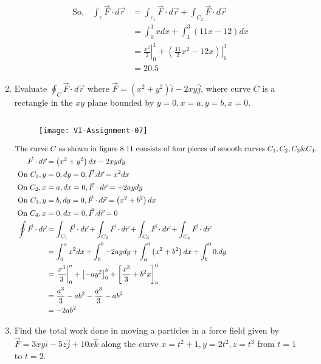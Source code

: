 \begin{enumerate}
\begin{answer}
\begin{align*}
	\text{So,}\quad
	\int_{c} \vec{F} \cdot d \vec{r}&=\int_{c_{1}} \vec{F} \cdot d \vec{r}+\int_{C_{2}} \vec{F} \cdot d \vec{r}\\
	&=\int_{0}^{1} x d x+\int_{1}^{3}(11 x-12) d x\\
	&=\left.\frac{x^{2}}{2}\right|_{0} ^{1}+\left.\left(\frac{11}{2} x^{2}-12 x\right)\right|_{1} ^{3}\\
	&=20.5
		\end{align*}
	\end{answer}
	\item Evaluate $\oint_{C} \vec{F} \cdot d \vec{r}$ where $\vec{F}=\left(x^{2}+y^{2}\right) \hat{i}-2 x y \hat{j}$, where curve $C$ is a rectangle in the $x y$ plane bounded by $y=0, x=a, y=b, x=0$.
	\begin{answer}$\left. \right. $
			\begin{figure}[H]
			\centering
			\texttt{[image: VI-Assignment-07]}
		\end{figure}
		\begin{align*}
		\intertext{The curve $C$ as shown in figure $8.11$ consists of four pieces of smooth curves $C_{1}, C_{2}, C_{3} \& C_{4}$. }
		\vec{F} \cdot d \vec{r}&=\left(x^{2}+y^{2}\right) d x-2 x y d y\\
		\text{On }C_{1}, y&=0, d y=0, \vec{F} . d \vec{r}=x^{2} d x\\
	\text{	On }C_{2}, x&=a, d x=0, \vec{F} \cdot d \vec{r}=-2 a y d y\\
		\text{On }C_{3}, y&=b, d y=0, \vec{F} \cdot d \vec{r}=\left(x^{2}+b^{2}\right) d x\\
		\text{On }C_{4}, x&=0, d x=0, \vec{F} . d \vec{r}=0\\
		\oint \vec{F} \cdot d \vec{r}&=\int_{C_{1}} \vec{F} \cdot d \vec{r}+\int_{C_{2}} \vec{F} \cdot d \vec{r}+\int_{C_{3}} \vec{F} \cdot d \vec{r}+\int_{C_{4}} \vec{F} \cdot d \vec{r}\\
		&=\int_{0}^{a} x^{2} d x+\int_{0}^{b}-2 a y d y+\int_{a}^{0}\left(x^{2}+b^{2}\right) d x+\int_{b}^{0} 0 . d y\\
		&=\left.\frac{x^{3}}{3}\right|_{0} ^{a}+\left[-a y^{2}\right]_{0}^{b}+\left[\frac{x^{3}}{3}+b^{2} x\right]_{a}^{0}\\
		&=\frac{a^{3}}{3}-a b^{2}-\frac{a^{3}}{3}-a b^{2}\\
		&=-2 a b^{2}
		\end{align*}
	\end{answer}
	\item Find the total work done in moving a particles in a force field given by $\vec{F}=3 x y \hat{i}-5 z \hat{j}+10 x \hat{k}$ along the curve $x=t^{2}+1, y=2 t^{2}, z=t^{3}$ from $t=1$ to $t=2$.

\end{enumerate}
